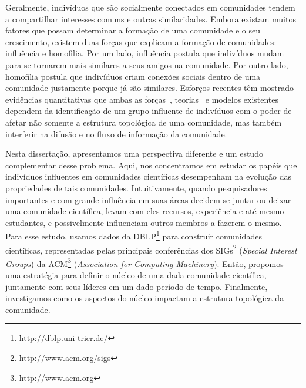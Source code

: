 Geralmente, indivíduos que são socialmente conectados em comunidades tendem a compartilhar interesses comuns
e outras similaridades. Embora existam muitos fatores que possam determinar a formação de uma comunidade
e o seu crescimento, existem duas forças que explicam a formação de comunidades: influência 
e homofilia. Por um lado, influência postula que indivíduos mudam para se tornarem mais similares
a seus amigos na comunidade. Por outro lado, homofilia postula que indivíduos criam conexões 
sociais dentro de uma comunidade justamente porque já são similares. Esforços recentes 
têm mostrado evidências quantitativas que ambas as forças~\citep{Cha2010,Backstrom2006},
teorias~\citep{Rogers1962,Watts2007} e modelos existentes~\citep{Kempe2003,Kempe2005} 
dependem da identificação de um grupo influente 
de indivíduos com o poder de afetar não somente a estrutura topológica de uma comunidade, 
mas também interferir na difusão e no fluxo de informação da comunidade.

Nesta dissertação, apresentamos uma perspectiva diferente e um estudo complementar desse problema. 
Aqui, nos concentramos em estudar os papéis que indivíduos influentes em comunidades científicas
desempenham na evolução das propriedades de tais comunidades. Intuitivamente, quando pesquisadores 
importantes e com grande influência em suas áreas decidem se juntar ou deixar uma comunidade científica, levam com eles recursos,
experiência e até mesmo estudantes, e possivelmente influenciam outros membros a fazerem o mesmo. Para esse 
estudo, usamos dados da DBLP\footnote{http://dblp.uni-trier.de/} para construir 
comunidades científicas, representadas pelas principais conferências
dos SIGs\footnote{http://www.acm.org/sigs} (\textit{Special Interest Groups}) da ACM\footnote{http://www.acm.org}
(\textit{Association for Computing Machinery}). Então, propomos uma estratégia para definir o 
núcleo de uma dada comunidade científica, juntamente com seus líderes em um dado período de 
tempo. Finalmente, investigamos como os aspectos do núcleo impactam a estrutura topológica da comunidade.

